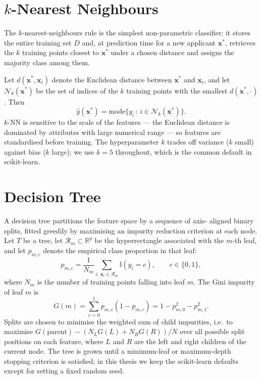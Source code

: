 \section{\texorpdfstring{$k$-Nearest Neighbours}{k-Nearest Neighbours}}
\label{sec:knn}

The $k$-nearest-neighbours rule is the simplest non-parametric
classifier: it stores the entire training set $D$ and, at prediction
time for a new applicant $\mathbf{x}^{*}$, retrieves the $k$ training
points closest to $\mathbf{x}^{*}$ under a chosen distance and assigns
the majority class among them.

Let $d(\mathbf{x}^{*},\mathbf{x}_i)$ denote the Euclidean distance
between $\mathbf{x}^{*}$ and $\mathbf{x}_i$, and let
$\mathcal{N}_k(\mathbf{x}^{*})$ be the set of indices of the $k$
training points with the smallest $d(\mathbf{x}^{*},\cdot)$. Then
\begin{equation}
\hat{y}(\mathbf{x}^{*})
=
\mathrm{mode}
\bigl\{
y_i \,:\, i\in\mathcal{N}_k(\mathbf{x}^{*})
\bigr\}.
\tag{2.3}
\label{eq:knn}
\end{equation}
$k$-NN is sensitive to the scale of the features --- the Euclidean
distance is dominated by attributes with large numerical range ---
so features are standardised before training. The hyperparameter
$k$ trades off variance ($k$ small) against bias ($k$ large); we use
$k=5$ throughout, which is the common default in scikit-learn.

\section{Decision Tree}
\label{sec:dt}

A decision tree partitions the feature space by a sequence of axis-
aligned binary splits, fitted greedily by maximising an impurity
reduction criterion at each node. Let
$T$ be a tree, let $\mathcal{R}_m\subset\mathbb{R}^{p}$ be the
hyperrectangle associated with the $m$-th leaf, and let $p_{m,c}$
denote the empirical class proportion in that leaf:
\begin{equation}
p_{m,c}
=
\frac{1}{N_m}
\sum_{i:\,\mathbf{x}_i\in\mathcal{R}_m}
\mathbb{I}(y_i = c),
\qquad c\in\{0,1\},
\tag{2.4}
\end{equation}
where $N_m$ is the number of training points falling into leaf $m$.
The Gini impurity of leaf $m$ is
\begin{equation}
G(m)
=
\sum_{c=0}^{1}
p_{m,c}(1-p_{m,c})
=
1 - p_{m,0}^{2} - p_{m,1}^{2}.
\tag{2.5}
\label{eq:gini}
\end{equation}
Splits are chosen to minimise the weighted sum of child impurities,
i.e.\ to maximise $G(\text{parent})-(N_L G(L)+N_R G(R))/N$ over all
possible split positions on each feature, where $L$ and $R$ are the
left and right children of the current node. The tree is grown
until a minimum-leaf or maximum-depth stopping criterion is satisfied;
in this thesis we keep the scikit-learn defaults except for setting
a fixed random seed.

